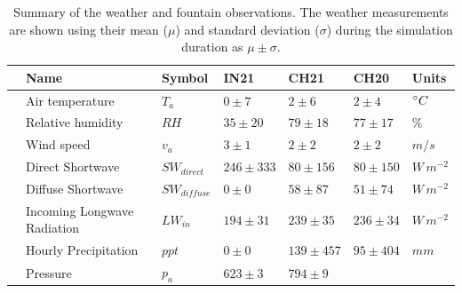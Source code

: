 \documentclass[utf8]{frontiersSCNS}
\begin{document}
\begin{table}
	\centering
	\caption{Summary of the weather and fountain observations. The weather measurements are shown using their
		mean ($\mu$) and standard deviation ($\sigma$) during the simulation duration as $\mu \pm \sigma$. }
	\label{tab:Observations}
	\begin{tabular}{@{}|lllllll|@{}}
		\toprule
		\textbf{}              & \textbf{Name}               & \textbf{Symbol} & \textbf{IN21} &
		\textbf{CH21}          & \textbf{CH20}               & \textbf{Units}                                                              \\ \midrule
		\multicolumn{1}{|l|}{\multirow{9}{*}{\rotatebox[origin=c]{90}{Weather}}}
		                       & Air temperature             & $T_a    $       & $0 \pm 7$     & $2 \pm 6$    & $2
		\pm 4$                 & $\degree C$                                                                                               \\
		\multicolumn{1}{|l|}{} & Relative humidity           & $RH     $       & $35 \pm 20$   & $79 \pm 18$  & $77
		\pm 17$                & \%                                                                                                        \\
		\multicolumn{1}{|l|}{} & Wind speed                  & $v_a        $   & $3 \pm 1$     & $2 \pm 2$    &
		$2 \pm 2$              & $m/s$                                                                                                     \\
		\multicolumn{1}{|l|}{} & Direct Shortwave            & $SW_{direct} $  & $246 \pm 333$ & $80 \pm 156$
		                       & $80 \pm 150$                & $W\,m^{-2}$                                                                 \\
		\multicolumn{1}{|l|}{} & Diffuse Shortwave           & $SW_{diffuse}$  & $0 \pm 0$     & $58 \pm 87$  & $51 \pm 74$  & $W\,m^{-2}$ \\
		\multicolumn{1}{|l|}{} & Incoming Longwave Radiation & $LW_{in}$       & $194 \pm 31$  & $239 \pm 35$ & $236 \pm 34$ & $W\,m^{-2}$ \\
		\multicolumn{1}{|l|}{} & Hourly Precipitation        & $ppt        $   & $0 \pm 0$     & $139 \pm
		457$                   & $95 \pm 404$                & $mm$                                                                        \\
		\multicolumn{1}{|l|}{} & Pressure                    & $p_a         $  & $623 \pm 3$   & $794 \pm 9$  &

\end{tabular}
\end{table}
\end{document}
